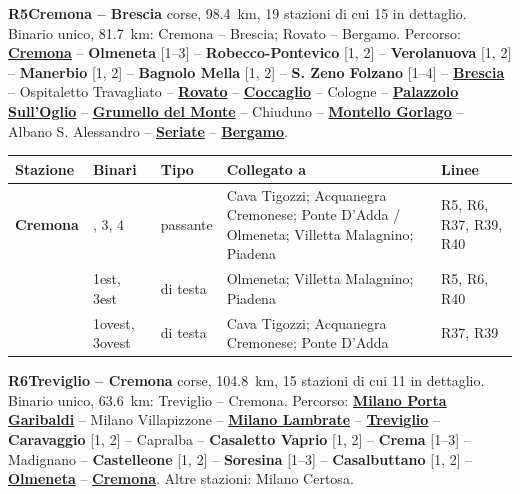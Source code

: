 \medskip\noindent\hypertarget{lin:R5}{\textbf{R5\enspace Cremona -- Brescia}} corse, \SI{98,4}{\km}, 19 stazioni di cui 15 in dettaglio. Binario unico, \SI{81,7}{\km}: Cremona -- Brescia; Rovato -- Bergamo. Percorso: \hyperlink{sta:S01915}{\textbf{Cremona}} -- \hypertarget{sta:S01905}{\textbf{Olmeneta}} [1--3] -- \hypertarget{sta:S01904}{\textbf{Robecco-Pontevico}} [1, 2] -- \hypertarget{sta:S01903}{\textbf{Verolanuova}} [1, 2] -- \hypertarget{sta:S01902}{\textbf{Manerbio}} [1, 2] -- \hypertarget{sta:S01901}{\textbf{Bagnolo Mella}} [1, 2] -- \hypertarget{sta:S01900}{\textbf{S. Zeno Folzano}} [1--4] -- \hyperlink{sta:S09999}{\textbf{Brescia}} -- Ospitaletto Travagliato -- \hyperlink{sta:S01714}{\textbf{Rovato}} -- \hyperlink{sta:S01540}{\textbf{Coccaglio}} -- Cologne -- \hyperlink{sta:S01538}{\textbf{Palazzolo Sull'Oglio}} -- \hyperlink{sta:S01537}{\textbf{Grumello del Monte}} -- Chiuduno -- \hyperlink{sta:S01535}{\textbf{Montello Gorlago}} -- Albano S. Alessandro -- \hyperlink{sta:S01533}{\textbf{Seriate}} -- \hyperlink{sta:S01529}{\textbf{Bergamo}}.
{\footnotesize\setlength{\LTpre}{2pt}\setlength{\LTpost}{0pt}
\begin{longtable}{@{}>{\raggedright\arraybackslash}p{}>{\raggedright\arraybackslash}p{}>{\raggedright\arraybackslash}p{}>{\raggedright\arraybackslash}p{}>{\raggedright\arraybackslash}p{}@{}}
\toprule
Stazione & Binari & Tipo & Collegato a & Linee \\
\midrule
\endhead
\leavevmode\hypertarget{sta:S01915}{}\textbf{Cremona} & 1, 3, 4 & passante & Cava Tigozzi; Acquanegra Cremonese; Ponte D'Adda / Olmeneta; Villetta Malagnino; Piadena & R5, R6, R37, R39, R40 \\
 & 1est, 3est & di testa & Olmeneta; Villetta Malagnino; Piadena & R5, R6, R40 \\
 & 1ovest, 3ovest & di testa & Cava Tigozzi; Acquanegra Cremonese; Ponte D'Adda & R37, R39 \\
\bottomrule
\end{longtable}}

\medskip\noindent\hypertarget{lin:R6}{\textbf{R6\enspace Treviglio -- Cremona}} corse, \SI{104,8}{\km}, 15 stazioni di cui 11 in dettaglio. Binario unico, \SI{63,6}{\km}: Treviglio -- Cremona. Percorso: \hyperlink{sta:S01645}{\textbf{Milano Porta Garibaldi}} -- Milano Villapizzone -- \hyperlink{sta:S01701}{\textbf{Milano Lambrate}} -- \hyperlink{sta:S01708}{\textbf{Treviglio}} -- \hypertarget{sta:S01602}{\textbf{Caravaggio}} [1, 2] -- Capralba -- \hypertarget{sta:S01604}{\textbf{Casaletto Vaprio}} [1, 2] -- \hypertarget{sta:S01605}{\textbf{Crema}} [1--3] -- Madignano -- \hypertarget{sta:S01606}{\textbf{Castelleone}} [1, 2] -- \hypertarget{sta:S01607}{\textbf{Soresina}} [1--3] -- \hypertarget{sta:S01609}{\textbf{Casalbuttano}} [1, 2] -- \hyperlink{sta:S01905}{\textbf{Olmeneta}} -- \hyperlink{sta:S01915}{\textbf{Cremona}}. Altre stazioni: Milano Certosa.

